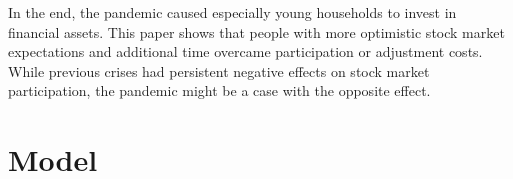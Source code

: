 \documentclass[ProjectABM]{subfiles}
\begin{document}
In the end, the pandemic caused especially young households to invest in financial assets. This paper shows that people with more optimistic stock market expectations and additional time overcame participation or adjustment costs. While previous crises had persistent negative effects on stock market participation, the pandemic might be a case with the opposite effect.%


\section{Model}
\end{document}
